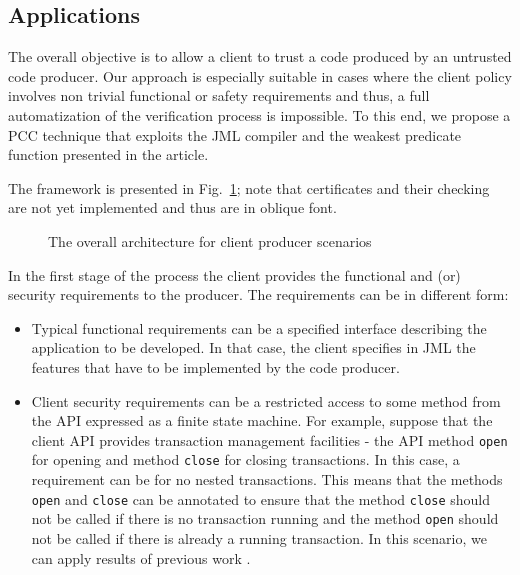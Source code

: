 \subsection{Applications}
\label{architecture_s}	


The overall objective is to allow a client to trust a code produced by an untrusted code producer. Our approach is especially suitable
 in cases where the client policy involves non trivial functional or safety requirements and thus, a full automatization of the verification 
process is impossible. To this end, we propose a PCC technique that exploits the JML compiler and the weakest predicate function presented in the article. 
 
 The framework is presented in Fig.~\ref{architecture}; note that certificates and their checking are not yet implemented
 and thus are in oblique font.
  


 \begin{figure}[!tbp]
 \centering
{}
\caption{\sc The overall architecture for client producer scenarios }
\label{architecture}
\end{figure}





In the first stage of the process the client provides the functional and (or) security requirements to the producer.
 The requirements can be in different form:
\begin{itemize}
\item Typical functional requirements can be a specified interface describing the application to be developed. 
In that case, the client specifies in JML the features that have to be implemented by the code producer.
\item Client security requirements can be a restricted access to some method from the API expressed as a finite state machine.
For example, suppose that the client API provides transaction management facilities - the API method \texttt{open} for opening and method 
\texttt{close} for closing transactions. In this case, a requirement can be for no nested transactions.
This means that the methods \texttt{open} and \texttt{close} can be annotated to ensure that the method \texttt{close} 
 should not be called if there is no transaction running and the method \texttt{open} should not be called if there is already a running transaction. 
In this scenario, we can apply results of previous work \cite{m+04:cardis}.  
\end{itemize}

